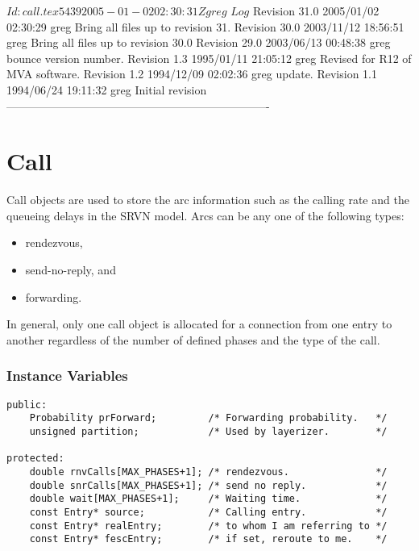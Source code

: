 \C 
\C $Id: call.tex 5439 2005-01-02 02:30:31Z greg $
\C 
\C $Log$
\C Revision 31.0  2005/01/02 02:30:29  greg
\C Bring all files up to revision 31.
\C
\C Revision 30.0  2003/11/12 18:56:51  greg
\C Bring all files up to revision 30.0
\C
\C Revision 29.0  2003/06/13 00:48:38  greg
\C bounce version number.
\C
\C Revision 1.3  1995/01/11 21:05:12  greg
\C Revised for R12 of MVA software.
\C
\C Revision 1.2  1994/12/09  02:02:36  greg
\C update.
\C
\C Revision 1.1  1994/06/24  19:11:32  greg
\C Initial revision
\C
\C ----------------------------------------------------------------------
\section{Call}
\label{sec:call}

Call objects are used to store the arc information such as the calling
rate and the queueing delays in the SRVN model.  Arcs can be any one
of the following types:
\begin{itemize}
\item rendezvous,
\item send-no-reply, and
\item forwarding.
\end{itemize}
In general, only one call object is allocated for a connection from
one entry to another regardless of the number of defined phases and
the type of the call.

\subsubsection{Instance Variables}
\label{sec:call-ivars}
\begin{verbatim}
public:
    Probability prForward;         /* Forwarding probability.   */
    unsigned partition;            /* Used by layerizer.        */
    
protected:
    double rnvCalls[MAX_PHASES+1]; /* rendezvous.               */
    double snrCalls[MAX_PHASES+1]; /* send no reply.            */
    double wait[MAX_PHASES+1];     /* Waiting time.             */
    const Entry* source;           /* Calling entry.            */
    const Entry* realEntry;        /* to whom I am referring to */
    const Entry* fescEntry;        /* if set, reroute to me.    */
\end{verbatim}

